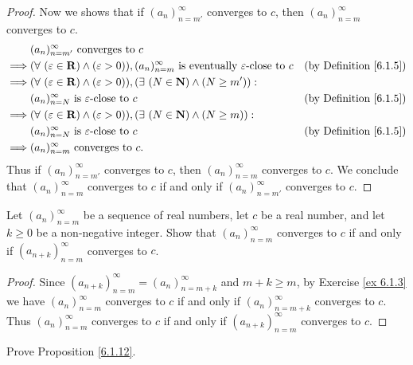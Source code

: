 \begin{proof}
Now we shows that if \((a_n)_{n = m'}^\infty\) converges to \(c\), then \((a_n)_{n = m}^\infty\) converges to \(c\).
\begin{align*}
& (a_n)_{n = m'}^\infty \text{ converges to } c \\
\implies & (\forall\ (\varepsilon \in \mathbf{R}) \land (\varepsilon > 0)), (a_n)_{n = m}^\infty \text{ is eventually } \varepsilon\text{-close to } c & \text{(by Definition \ref{6.1.5})} \\
\implies & (\forall\ (\varepsilon \in \mathbf{R}) \land (\varepsilon > 0)), (\exists\ (N \in \mathbf{N}) \land (N \geq m')) : \\
& (a_n)_{n = N}^\infty \text{ is } \varepsilon\text{-close to } c & \text{(by Definition \ref{6.1.5})} \\
\implies & (\forall\ (\varepsilon \in \mathbf{R}) \land (\varepsilon > 0)), (\exists\ (N \in \mathbf{N}) \land (N \geq m)) : \\
& (a_n)_{n = N}^\infty \text{ is } \varepsilon\text{-close to } c & \text{(by Definition \ref{6.1.5})} \\
\implies & (a_n)_{n = m}^\infty \text{ converges to } c.
\end{align*}
Thus if \((a_n)_{n = m'}^\infty\) converges to \(c\), then \((a_n)_{n = m}^\infty\) converges to \(c\).
We conclude that \((a_n)_{n = m}^\infty\) converges to \(c\) if and only if \((a_n)_{n = m'}^\infty\) converges to \(c\).
\end{proof}

\begin{exercise}\label{ex 6.1.4}
Let \((a_n)_{n = m}^\infty\) be a sequence of real numbers, let \(c\) be a real number, and let \(k \geq 0\) be a non-negative integer.
Show that \((a_n)_{n = m}^\infty\) converges to \(c\) if and only if \((a_{n + k})_{n = m}^\infty\) converges to \(c\).
\end{exercise}

\begin{proof}
Since \((a_{n + k})_{n = m}^\infty = (a_n)_{n = m + k}^\infty\) and \(m + k \geq m\), by Exercise \ref{ex 6.1.3} we have \((a_n)_{n = m}^\infty\) converges to \(c\) if and only if \((a_n)_{n = m + k}^\infty\) converges to \(c\).
Thus \((a_n)_{n = m}^\infty\) converges to \(c\) if and only if \((a_{n + k})_{n = m}^\infty\) converges to \(c\).
\end{proof}

\begin{exercise}\label{ex 6.1.5}
Prove Proposition \ref{6.1.12}.
\end{exercise}

